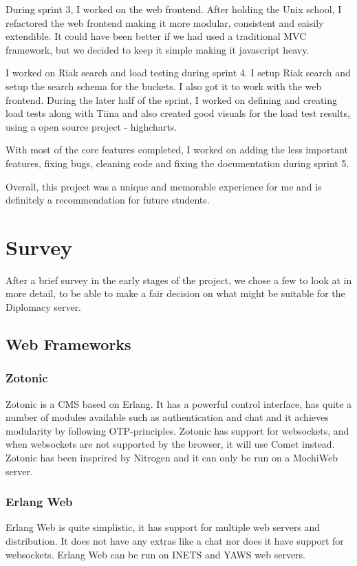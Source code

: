 \documentclass[11pt,a4paper]{report}
\begin{document}
During sprint 3, I worked on the web frontend. After holding the Unix school, I refactored the web frontend making it more modular, consistent and eaisily extendible. It could have been better if we had used a traditional MVC framework, but we decided to keep it simple making it javascript heavy.

I worked on Riak search and load testing during sprint 4. I setup Riak search and setup the search schema for the buckets. I also got it to work with the web frontend. During the later half of the sprint, I worked on defining and creating load tests along with Tiina and also created good visuals for the load test results, using a open source project - highcharts.

With most of the core features completed, I worked on adding the less important features, fixing bugs, cleaning code and fixing the documentation during sprint 5.

Overall, this project was a unique and memorable experience for me and is definitely a recommendation for future students.

\chapter{Survey}
After a brief survey in the early stages of the project, we chose a few to look
at in more detail, to be able to make a fair decision on what might be suitable
for the Diplomacy server.
\section{Web Frameworks}
\subsection{Zotonic}
Zotonic is a CMS based on Erlang. It has a powerful control interface, has
quite a number of modules available such as authentication and chat and it
achieves modularity by following OTP-principles. Zotonic has support for
websockets, and when websockets are not supported by the browser, it will use
Comet instead. Zotonic has been insprired by Nitrogen and it can only be run
on a MochiWeb server.
\subsection{Erlang Web}
Erlang Web is quite simplistic, it has support for multiple web servers and
distribution. It does not have any extras like a chat nor does it have support
for websockets. Erlang Web can be run on INETS and YAWS web servers.
\end{document}
